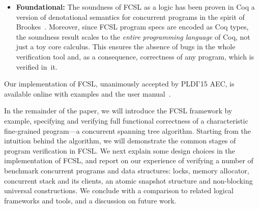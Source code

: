 \begin{itemize}[leftmargin=*]
\item \textbf{Foundational:} The soundness of FCSL as a logic has been
  proven in Coq \wrt a version of denotational semantics for
  concurrent programs in the spirit of
  Brookes~\cite{Brookes:TCS07}. Moreover, since FCSL program specs are
  encoded as Coq types, the soundness result scales to the
  \emph{entire programming language} of Coq, not just a toy core
  calculus. This ensures the absence of bugs in the whole verification
  tool and, as a consequence, correctness of any program, which is
  verified in~it.

\end{itemize}

\noindent
Our implementation of FCSL, unanimously accepted by PLDI'15 AEC, is
available online with examples and the user
manual~\cite{Sergey-al:PLDI15TR}.

In the remainder of the paper, we will introduce the FCSL framework by
example, specifying and verifying full functional correctness of a
characteristic fine-grained program---a concurrent spanning tree
algorithm.
%
Starting from the intuition behind the algorithm, we will demonstrate
the common stages of program verification in FCSL.
%
We next explain some design choices in the implementation
of FCSL, and report on our experience of verifying a number of
benchmark concurrent programs and data structures: locks, memory
allocator, concurrent stack and its clients, an atomic snapshot
structure and non-blocking universal constructions.
%
We conclude with a comparison to related logical frameworks
and tools, and a discussion on future work.

